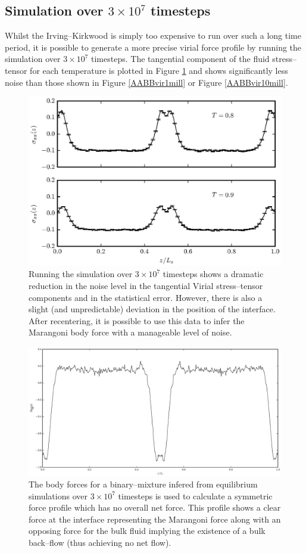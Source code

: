 \FloatBarrier
\subsection{Simulation over $3\times 10^{7}$ timesteps}
Whilst the Irving--Kirkwood is simply too expensive to run over such a long time period, it is possible to generate a more precise virial force profile by running the simulation over $3\times 10^{7}$ timesteps.
The tangential component of the fluid stress--tensor for each temperature is plotted in Figure \ref{AABBvir30mill} and shows significantly less noise than those shown in Figure \ref{AABBvir1mill} or Figure \ref{AABBvir10mill}.
\begin{figure}[h]
\includegraphics{AABBvir30mill}
\caption{Running the simulation over $3\times 10^{7}$ timesteps shows a dramatic reduction in the noise level in the tangential Virial stress--tensor components and in the statistical error.
However, there is also a slight (and unpredictable) deviation in the position of the interface.
After recentering, it is possible to use this data to infer the Marangoni body force with a manageable level of noise.}
\label{AABBvir30mill}
\end{figure}

\begin{figure}[h]
\includegraphics{AABBsymForce30mill}
\caption{The body forces for a binary--mixture infered from equilibrium simulations over $3\times 10^{7}$ timesteps is used to calculate a symmetric force profile which has no overall net force.
This profile shows a clear force at the interface representing the Marangoni force along with an opposing force for the bulk fluid implying the existence of a bulk back--flow (thus achieving no net flow).}
\label{AABBsymForce30mill}
\end{figure}


